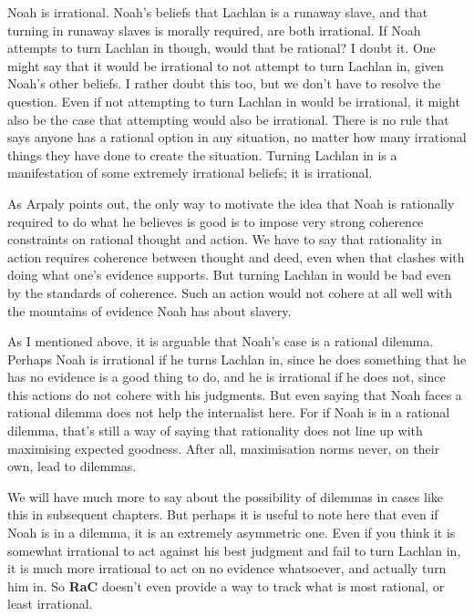 \gls{Noah} is irrational. \gls{Noah}'s beliefs that \gls{Lachlan} is a runaway slave, and that turning in runaway slaves is morally required, are both irrational. If \gls{Noah} attempts to turn \gls{Lachlan} in though, would that be rational? I doubt it. One might say that it would be irrational to not attempt to turn \gls{Lachlan} in, given \gls{Noah}'s other beliefs. I rather doubt this too, but we don't have to resolve the question. Even if not attempting to turn \gls{Lachlan} in would be irrational, it might also be the case that attempting would also be irrational. There is no rule that says anyone has a rational option in any situation, no matter how many irrational things they have done to create the situation. Turning \gls{Lachlan} in is a manifestation of some extremely irrational beliefs; it is irrational.

As Arpaly points out, the only way to motivate the idea that \gls{Noah} is rationally required to do what he believes is good is to impose very strong coherence constraints on rational thought and action. We have to say that rationality in action requires coherence between thought and deed, even when that clashes with doing what one's evidence supports. But turning \gls{Lachlan} in would be bad even by the standards of coherence. Such an action would not cohere at all well with the mountains of evidence \gls{Noah} has about slavery.

As I mentioned above, it is arguable that \gls{Noah}'s case is a rational dilemma. Perhaps \gls{Noah} is irrational if he turns \gls{Lachlan} in, since he does something that he has no evidence is a good thing to do, and he is irrational if he does not, since this actions do not cohere with his judgments. But even saying that \gls{Noah} faces a rational dilemma does not help the internalist here. For if \gls{Noah} is in a rational dilemma, that's still a way of saying that rationality does not line up with maximising expected goodness. After all, maximisation norms never, on their own, lead to dilemmas.

We will have much more to say about the possibility of dilemmas in cases like this in subsequent chapters. But perhaps it is useful to note here that even if \gls{Noah} is in a dilemma, it is an extremely asymmetric one. Even if you think it is somewhat irrational to act against his best judgment and fail to turn \gls{Lachlan} in, it is much more irrational to act on no evidence whatsoever, and actually turn him in. So \textbf{RaC} doesn't even provide a way to track what is most rational, or least irrational.

